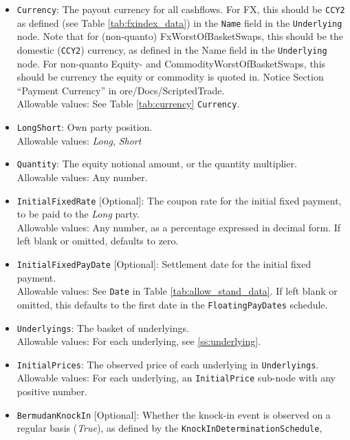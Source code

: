 \begin{itemize}
  \item \lstinline!Currency!: The payout currency for all cashflows. For FX, this should
  be \lstinline!CCY2! as defined (see Table \ref{tab:fxindex_data}) in the \lstinline!Name!
  field in the \lstinline!Underlying! node. Note that for (non-quanto) FxWorstOfBasketSwaps,
  this should be the domestic (\lstinline!CCY2!) currency, as defined in the Name field in the
  \lstinline!Underlying! node. For non-quanto Equity- and CommodityWorstOfBasketSwaps, this
  should be currency the equity or commodity is quoted in. Notice Section ``Payment Currency'' in ore/Docs/ScriptedTrade. \\
    Allowable values: See Table \ref{tab:currency} \lstinline!Currency!.
  \item \lstinline!LongShort!: Own party position. \\
    Allowable values: \emph{Long}, \emph{Short}
  \item \lstinline!Quantity!: The equity notional amount, or the quantity multiplier. \\
    Allowable values: Any number.
  \item \lstinline!InitialFixedRate! [Optional]: The coupon rate for the initial fixed
  payment, to be paid to the \emph{Long} party. \\
    Allowable values: Any number, as a percentage expressed in decimal form. If left blank
    or omitted, defaults to zero.
  \item \lstinline!InitialFixedPayDate! [Optional]: Settlement date for the initial fixed
  payment. \\
    Allowable values: See \lstinline!Date! in Table \ref{tab:allow_stand_data}. If left blank
    or omitted, this defaults to the first date in the \lstinline!FloatingPayDates! schedule.
  \item \lstinline!Underlyings!: The basket of underlyings. \\
    Allowable values: For each underlying, see \ref{ss:underlying}.
  \item \lstinline!InitialPrices!: The observed price of each underlying in \lstinline!Underlyings!. \\
    Allowable values: For each underlying, an \lstinline!InitialPrice! sub-node with
    any positive number.
  \item \lstinline!BermudanKnockIn! [Optional]: Whether the knock-in event is observed
  on a regular basis (\emph{True}), as defined by the \lstinline!KnockInDeterminationSchedule!,

\end{itemize}
